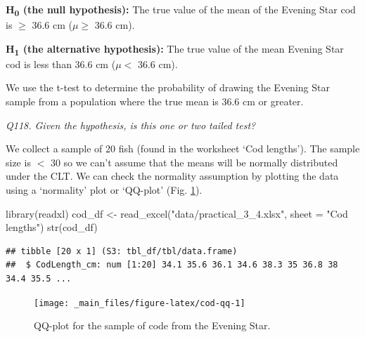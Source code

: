 \documentclass[
  11pt,
  a4paper,
]{book}
\newenvironment{Shaded}{\begin{snugshade}}{\end{snugshade}}
\newcommand{\AttributeTok}[1]{\textcolor[rgb]{0.77,0.63,0.00}{#1}}
\newcommand{\ConstantTok}[1]{\textcolor[rgb]{0.00,0.00,0.00}{#1}}
\newcommand{\FunctionTok}[1]{\textcolor[rgb]{0.00,0.00,0.00}{#1}}
\newcommand{\NormalTok}[1]{#1}
\newcommand{\OtherTok}[1]{\textcolor[rgb]{0.56,0.35,0.01}{#1}}
\newcommand{\SpecialCharTok}[1]{\textcolor[rgb]{0.00,0.00,0.00}{#1}}
\newcommand{\StringTok}[1]{\textcolor[rgb]{0.31,0.60,0.02}{#1}}
\begin{document}
\textbf{H\textsubscript{0} (the null hypothesis):} The true value of the mean of the Evening Star cod is \(\geq\) 36.6 cm (\(\mu \geq\) 36.6 cm).

\textbf{H\textsubscript{1} (the alternative hypothesis):} The true value of the mean Evening Star cod is less than 36.6 cm (\(\mu <\) 36.6 cm).

We use the t-test to determine the probability of drawing the Evening Star sample from a population where the true mean is 36.6 cm or greater.

\emph{Q118. Given the hypothesis, is this one or two tailed test?}

We collect a sample of 20 fish (found in the worksheet `Cod lengths'). The sample size is \(<\) 30 so we can't assume that the means will be normally distributed under the CLT. We can check the normality assumption by plotting the data using a `normality' plot or `QQ-plot' (Fig. \ref{fig:cod-qq}).

\begin{Shaded}
\begin{Highlighting}[]
\FunctionTok{library}\NormalTok{(readxl)}
\NormalTok{cod\_df }\OtherTok{\textless{}{-}} \FunctionTok{read\_excel}\NormalTok{(}\StringTok{"data/practical\_3\_4.xlsx"}\NormalTok{, }\AttributeTok{sheet =} \StringTok{"Cod lengths"}\NormalTok{)}
\FunctionTok{str}\NormalTok{(cod\_df)}
\end{Highlighting}
\end{Shaded}

\begin{verbatim}
## tibble [20 x 1] (S3: tbl_df/tbl/data.frame)
##  $ CodLength_cm: num [1:20] 34.1 35.6 36.1 34.6 38.3 35 36.8 38 34.4 35.5 ...
\end{verbatim}

\begin{Shaded}
\end{Shaded}

\begin{figure}

{\centering \texttt{[image: \_main\_files/figure-latex/cod-qq-1]} 

}

\caption{QQ-plot for the sample of code from the Evening Star.}\label{fig:cod-qq}
\end{figure}
\end{document}

